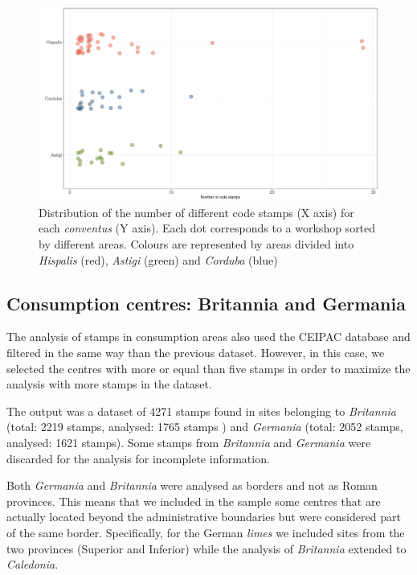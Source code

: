 \documentclass[review]{elsarticle}
\begin{document}
\begin{figure}[htp]
	\centering
\includegraphics[width=\linewidth]{figs/frequency}
\caption{Distribution of the number of different code stamps (X axis) for each \textit{conventus} (Y axis). Each dot corresponds to a workshop sorted by different areas. Colours are represented by areas divided into \textit{Hispalis} (red), \textit{Astigi} (green) and \textit{Corduba} (blue)}
\label{frequency}
\end{figure} 


\subsection{Consumption centres: Britannia and Germania}

The analysis of stamps in consumption areas also used the CEIPAC database and filtered in the same way than the previous dataset. However, in this case, we selected the centres with more or equal than five stamps in order to maximize the analysis with more stamps in the dataset.   

The output was a dataset of 4271 stamps found in sites belonging to \textit{Britannia} (total: 2219 stamps, analysed: 1765 stamps ) and \textit{Germania} (total: 2052 stamps, analysed: 1621 stamps). Some stamps from \textit{Britannia} and \textit{Germania} were discarded for the analysis for incomplete information.  

Both \textit{Germania} and \textit{Britannia} were analysed as borders and not as Roman provinces. This means that we included in the sample some centres that are actually located beyond the administrative boundaries but were considered part of the same border. Specifically, for the German \textit{limes} we included sites from the two provinces (Superior and Inferior) while the analysis of \textit{Britannia} extended to \textit{Caledonia}.
 
\end{document}
